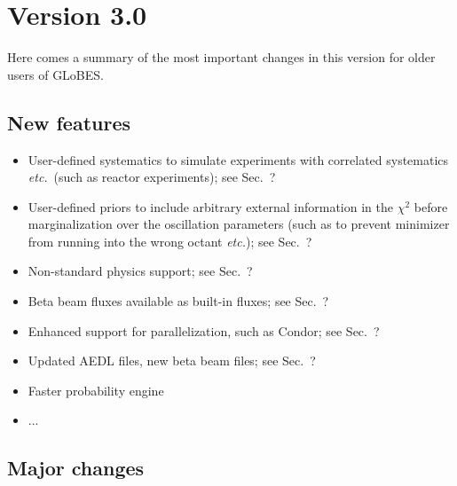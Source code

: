 \documentclass[a4paper,12pt,twoside]{book}
\newcommand{\etc}{{\it etc.}}
\newcommand{\Sec}{Sec.}
\begin{document}
\section*{Version 3.0}

Here comes a summary of the most important changes in this version for older users of GLoBES.

\subsection*{New features}

\begin{itemize}
 \item
  User-defined systematics to simulate experiments with correlated systematics \etc\ (such as
reactor experiments); see \Sec~?
 \item
  User-defined priors to include arbitrary external information in the $\chi^2$ before
marginalization over the oscillation parameters (such as to prevent minimizer from
running into the wrong octant \etc); see \Sec~?
\item
  Non-standard physics support; see \Sec~?
\item
  Beta beam fluxes available as built-in fluxes; see \Sec~?
\item
  Enhanced support for parallelization, such as Condor; see \Sec~?
\item
  Updated AEDL files, new beta beam files; see \Sec~?
\item
 Faster probability engine
\item
  ...
\end{itemize}

\subsection*{Major changes}
\end{document}
